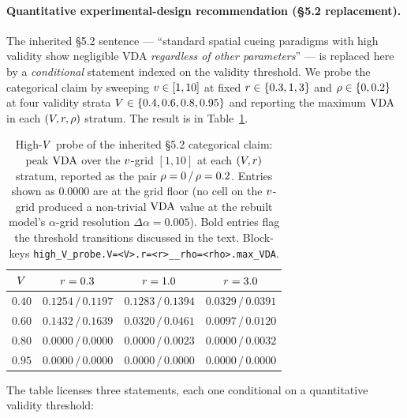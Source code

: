 \paragraph{Quantitative experimental-design recommendation
(§5.2 replacement).}
The inherited §5.2 sentence --- ``standard spatial cueing paradigms
with high validity show negligible VDA \emph{regardless of other
parameters}'' --- is replaced here by a \emph{conditional} statement
indexed on the validity threshold. We probe the categorical claim by
sweeping $v \in [1, 10]$ at fixed $r \in \{0.3, 1, 3\}$ and
$\rho \in \{0, 0.2\}$ at four validity strata $V \in \{0.4,
0.6, 0.8, 0.95\}$ and reporting the maximum $\mathrm{VDA}$ in each
$(V, r, \rho)$ stratum. The result is in
Table~\ref{tab:c3-highV-probe}.
%
\begin{table}[t]
  \centering
  \small
  \begin{tabular}{c c c c}
    \toprule
    $V$ & $r = 0.3$ & $r = 1.0$ & $r = 3.0$ \\
    \midrule
    $0.40$  & $0.1254\,/\,0.1197$ & $0.1283\,/\,0.1394$ & $0.0329\,/\,0.0391$\\
    $0.60$  & $0.1432\,/\,\mathbf{0.1639}$ & $0.0320\,/\,0.0461$ & $0.0097\,/\,0.0120$\\
    $0.80$  & $0.0000\,/\,0.0000$ & $0.0000\,/\,\mathbf{0.0023}$ & $0.0000\,/\,\mathbf{0.0032}$\\
    $0.95$  & $0.0000\,/\,0.0000$ & $0.0000\,/\,0.0000$ & $0.0000\,/\,0.0000$\\
    \bottomrule
  \end{tabular}
  \caption{High-$V$ probe of the inherited §5.2 categorical
  claim: peak $\mathrm{VDA}$ over the $v$-grid $[1, 10]$ at each
  $(V, r)$ stratum, reported as the pair $\rho = 0\,/\,
  \rho = 0.2$. Entries shown as $0.0000$ are at the grid floor (no
  cell on the $v$-grid produced a non-trivial $\mathrm{VDA}$ value at the
  rebuilt model's $\alpha$-grid resolution $\Delta\alpha = 0.005$).
  Bold entries flag the threshold transitions discussed in the
  text. Block-keys \texttt{high\_V\_probe.V=<V>.r=<r>\_\_rho=<rho>.max\_VDA}.}
  \label{tab:c3-highV-probe}
\end{table}
%
The table licenses three statements, each one conditional on a
quantitative validity threshold:
